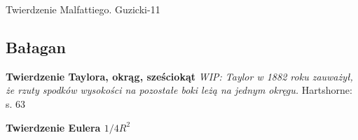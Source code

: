 
Twierdzenie Malfattiego.
Guzicki-11

\subsection{Bałagan}

\textbf{Twierdzenie Taylora, okrąg, sześciokąt}
{
    \emph{WIP: Taylor w 1882 roku zauważył, że rzuty spodków wysokości na pozostałe boki leżą na jednym okręgu.}
	Hartshorne: s. 63
}

\textbf{Twierdzenie Eulera $1/4R^2$}



%